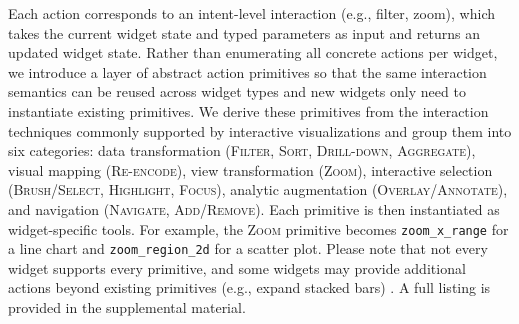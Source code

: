 Each action corresponds to an intent-level interaction (e.g., filter, zoom), which takes the current widget state and typed parameters as input and returns an updated widget state.
Rather than enumerating all concrete actions per widget, we introduce a layer of abstract action primitives so that the same interaction semantics can be reused across widget types and new widgets only need to instantiate existing primitives.
We derive these primitives from the interaction techniques commonly supported by interactive visualizations and group them into six categories: data transformation (\textsc{Filter}, \textsc{Sort}, \textsc{Drill-down}, \textsc{Aggregate}), visual mapping (\textsc{Re-encode}), view transformation (\textsc{Zoom}), interactive selection (\textsc{Brush/Select}, \textsc{Highlight}, \textsc{Focus}), analytic augmentation (\textsc{Overlay/Annotate}), and navigation (\textsc{Navigate}, \textsc{Add/Remove}).
Each primitive is then instantiated as widget-specific tools.
For example, the \textsc{Zoom} primitive becomes \texttt{zoom\_x\_range} for a line chart and \texttt{zoom\_region\_2d} for a scatter plot.
Please note that not every widget supports every primitive, and some widgets may provide additional actions beyond existing primitives (e.g., expand stacked bars) .
A full listing is provided in the supplemental material.







